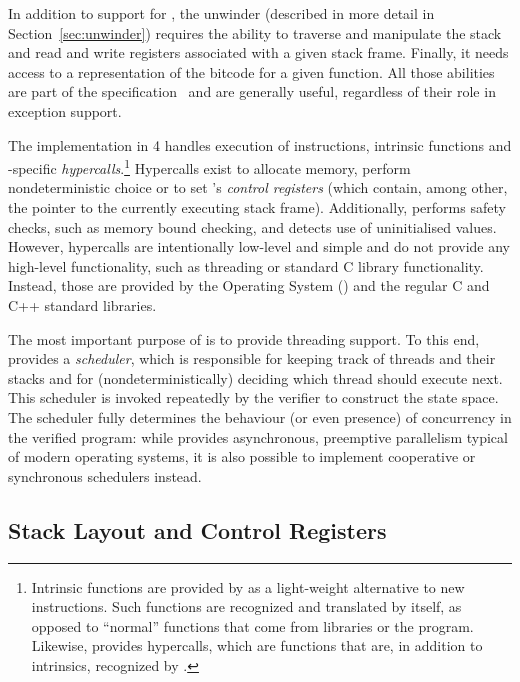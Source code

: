 In addition to support for \llvm{}, the unwinder (described in more detail
in Section~\ref{sec:unwinder}) requires the ability to traverse and
manipulate the stack and read and write \llvm{} registers associated with a
given stack frame. Finally, it needs access to a representation of the
bitcode for a given function. All those abilities are part of the \divm{}
specification~\cite{rockai17:divm} and are generally useful, regardless
of their role in exception support.

The \divm{} implementation in \divine{} 4 handles execution of \llvm{}
instructions, \llvm{} intrinsic functions and \divm{}-specific
\emph{hypercalls}.\footnote{Intrinsic functions are provided by \llvm{} as
  a light-weight alternative to new instructions. Such functions are
  recognized and translated by \llvm{} itself, as opposed to ``normal''
  functions that come from libraries or the program. Likewise, \divm{}
  provides hypercalls, which are functions that are, in addition to \llvm{}
  intrinsics, recognized by \divm{}.} Hypercalls exist to allocate memory,
perform nondeterministic choice or to set \divm{}'s \emph{control
registers} (which contain, among other, the pointer to the currently
executing stack frame). Additionally, \divm{} performs safety checks, such
as memory bound checking, and detects use of uninitialised values.
However, \divm{} hypercalls are intentionally low-level and simple and do
not provide any high-level functionality, such as threading or standard
C library functionality. Instead, those are provided by the \divine{}
Operating System (\dios{}) and the regular C and C++ standard libraries.

The most important purpose of \dios{} is to provide threading support. To
this end, \dios{} provides a \emph{scheduler}, which is responsible for
keeping track of threads and their stacks and for (nondeterministically)
deciding which thread should execute next. This scheduler is invoked
repeatedly by the verifier to construct the state space. The scheduler
fully determines the behaviour (or even presence) of concurrency in the
verified program: while \dios{} provides asynchronous, preemptive
parallelism typical of modern operating systems, it is also possible to
implement cooperative or synchronous schedulers instead.

\subsection{Stack Layout and Control Registers}\label{sec:stack-layout}

